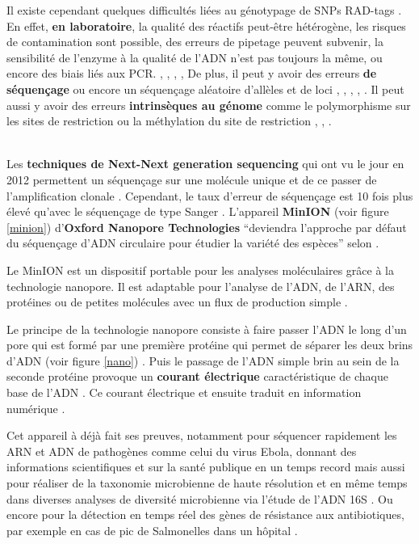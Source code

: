 \documentclass[a4paper,11pt,twoside]{report}
\begin{document}
Il existe cependant quelques difficultés liées au génotypage de SNPs RAD-tags \citep{PanteE2014} \citep{mastretta2015restriction}.
En effet, \textbf{en laboratoire}, la qualité des réactifs peut-être hétérogène, les risques de contamination sont possible, des erreurs de pipetage peuvent subvenir, la sensibilité de l’enzyme à la qualité de l’ADN n'est pas toujours la même, ou encore des biais liés aux PCR. \citep{Bonin2004aa}, \citep{Baird2008aa}, \citep{peterson2012double}, \citep{hohenlohe2012extensive}, \citep{PanteE2014}
De plus, il peut y avoir des erreurs \textbf{de séquençage} ou encore un séquençage aléatoire d’allèles et de loci \citep{meacham2011identification}, \citep{nielsen2011genotype}, \citep{hohenlohe2012extensive}, \citep{loman2012performance}, \citep{PanteE2014}.
Il peut aussi y avoir des erreurs \textbf{intrinsèques au génome} comme le polymorphisme sur les sites de restriction ou la méthylation du site de restriction \citep{davey2013special}, \citep{gautier2013effect}, \citep{PanteE2014}.

~~\\

Les \textbf{techniques de Next-Next generation sequencing} qui ont vu le jour en 2012 permettent un séquençage sur une molécule unique et de ce passer de l'amplification clonale \citep{Boyle2014aa}. Cependant, le taux d'erreur de séquençage est 10 fois plus élevé qu'avec le séquençage de type Sanger \citep{Boyle2014aa}. L'appareil \textbf{MinION} (voir figure \ref{minion}) d'\textbf{Oxford Nanopore Technologies} ``deviendra l'approche par défaut du séquençage d'ADN circulaire pour étudier la variété des espèces'' selon \citep{hargreaves2015assessing}. 

Le MinION est un dispositif portable pour les analyses moléculaires grâce à la technologie nanopore. Il est adaptable pour l'analyse de l'ADN, de l'ARN, des protéines ou de petites molécules avec un flux de production simple \citep{nanoport}.

Le principe de la technologie nanopore consiste à faire passer l'ADN le long d'un pore qui est formé par une première protéine qui permet de séparer les deux brins d'ADN (voir figure \ref{nano}) \citep{Boyle2014aa}. Puis le passage de l'ADN simple brin au sein de la seconde protéine provoque un \textbf{courant électrique} caractéristique de chaque base de l'ADN \citep{Boyle2014aa}. Ce courant électrique et ensuite traduit en information numérique \citep{hargreaves2015assessing}. 

Cet appareil à déjà fait ses preuves, notamment pour séquencer rapidement les ARN et ADN de pathogènes comme celui du virus Ebola, donnant des informations scientifiques et sur la santé publique en un temps record \citep{Hoenen2015aa} mais aussi pour réaliser de la taxonomie microbienne de haute résolution et en même temps dans diverses analyses de diversité microbienne via l'étude de l'ADN 16S \citep{benitez2015species}. Ou encore pour la détection en temps réel des gènes de résistance aux antibiotiques, par exemple en cas de pic de Salmonelles dans un hôpital \citep{Quick2015aa}.
\end{document}
